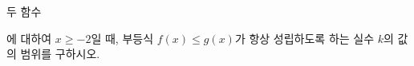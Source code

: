 두 함수\par\smallskip{}\par\smallskip\noindent 에 대하여 $x\ge -2$일 때, 부등식 $f(x)\le g(x)$가 항상 성립하도록 하는 실수 $k$의 값의 범위를 구하시오.
